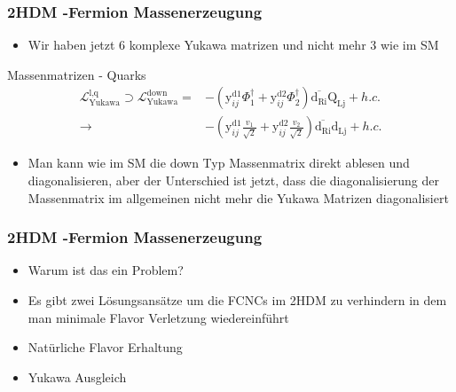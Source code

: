 \documentclass[xcolor=dvipsnames]{beamer}
\begin{document}
\begin{frame}
\frametitle{2HDM -Fermion Massenerzeugung}
\begin{itemize}
\item Wir haben jetzt 6 komplexe Yukawa matrizen und nicht mehr 3 wie im SM 
\end{itemize}
\begin{block}{Massenmatrizen - Quarks }
\begin{equation*}
\begin{split}
\mathscr{L}_{\text{Yukawa}}^{\text{l,q}}\supset \mathscr{L}_{\text{Yukawa}}^{\text{down}} =&-(\text{y}^{\text{d1}}_{ij}\Phi_{1}^{\dagger}+\text{y}^{\text{d2}}_{ij}\Phi_{2}^{\dagger})\overline{\text{d}_{\text{Ri}}}\text{Q}_{\text{Lj}} +h.c. \\
\rightarrow &-(\text{y}^{\text{d1}}_{ij}\frac{v_{1}}{\sqrt{2}}+\text{y}^{\text{d2}}_{ij}\frac{v_{2}}{\sqrt{2}})\overline{\text{d}_{\text{Ri}}}\text{d}_{\text{Lj}} +h.c. 
\end{split}
\end{equation*}
\end{block}

\begin{itemize}
\item Man kann wie im SM die down Typ Massenmatrix direkt ablesen und diagonalisieren, aber der Unterschied ist jetzt, dass die diagonalisierung der Massenmatrix  im allgemeinen nicht mehr die Yukawa Matrizen diagonalisiert 
\end{itemize}
\end{frame}
\begin{frame}[t]
\frametitle{2HDM -Fermion Massenerzeugung}
\begin{itemize}

\item Warum ist das ein Problem?



\item Es gibt zwei Lösungsansätze um die FCNCs im 2HDM zu verhindern in dem man minimale Flavor Verletzung wiedereinführt
\item Natürliche Flavor Erhaltung
\item Yukawa Ausgleich 
\end{itemize}

\end{frame}
\end{document}
